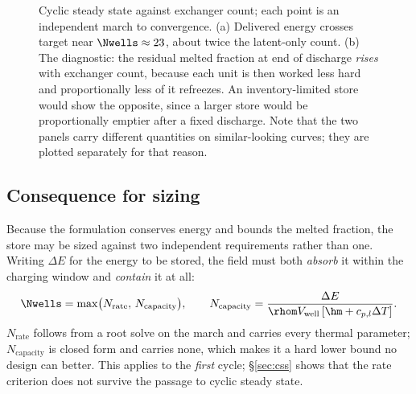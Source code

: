 \begin{figure}[htbp]
\centering
{}
\caption{Cyclic steady state against exchanger count; each point is an
independent march to convergence. (a) Delivered energy crosses target near
$\Nwells\approx23$, about twice the latent-only count. (b) The diagnostic: the
residual melted fraction at end of discharge \emph{rises} with exchanger count,
because each unit is then worked less hard and proportionally less of it
refreezes. An inventory-limited store would show the opposite, since a larger
store would be proportionally emptier after a fixed discharge. Note that the two
panels carry different quantities on similar-looking curves; they are plotted
separately for that reason.}
\label{fig:cssdesign}
\end{figure}


\subsection{Consequence for sizing}

Because the formulation conserves energy and bounds the melted fraction, the
store may be sized against two independent requirements rather than one. Writing
$\Delta E$ for the energy to be stored, the field must both \emph{absorb} it
within the charging window and \emph{contain} it at all:
\begin{equation}
  \Nwells = \max\bigl(N_{\mathrm{rate}},\,N_{\mathrm{capacity}}\bigr),
  \qquad
  N_{\mathrm{capacity}} = \frac{\Delta E}
  {\rhom V_{\mathrm{well}}\left[\hm+c_{p,l}\Delta T\right]}.
  \label{eq:sizing}
\end{equation}
$N_{\mathrm{rate}}$ follows from a root solve on the march and carries every
thermal parameter; $N_{\mathrm{capacity}}$ is closed form and carries none, which
makes it a hard lower bound no design can better. This applies to the
\emph{first} cycle; \S\ref{sec:css} shows that the rate criterion does not
survive the passage to cyclic steady state.

